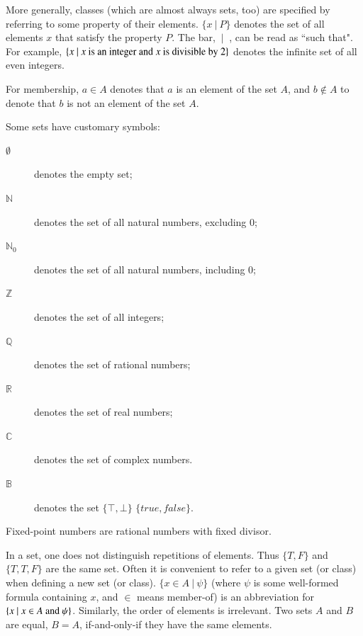 \pn More generally, classes (which are almost always sets, too) are specified by referring to some property of their elements.
\(\{x~\vert~ P\}\)
denotes the set of all elements $x$ that satisfy the property $P$.  The bar, $~\vert~$
, can be read as ``such that".
For example,
\(\{x~\vert~x~$is an integer and$~x~$is divisible by 2$\}\)
denotes the infinite set of all even integers.

\pn For membership, $a\in A$ denotes that $a$ is an element of the set $A$, and 
$b\notin A$ to denote that $b$ is not an element of the set $A$.  

\pn Some sets have customary symbols: 
\begin{description}
\item[$\emptyset$] denotes the empty 
set;
\item[$\mathbb{N}$] denotes the set of all natural numbers, excluding 0; 
\item[$\mathbb{N}_0$] denotes the set of all natural numbers, including 0; 
\item[$\mathbb{Z}$] denotes the set of all integers; 
\item[$\mathbb{Q}$] denotes the set of rational numbers; 
\item[$\mathbb{R}$] denotes the set of real numbers;
\item[$\mathbb{C}$] denotes the set of complex numbers.
\item[$\mathbb{B}$] denotes the set \(\{\top, \bot\}\) \(\{{true}, {false}\}\).
\end{description}
Fixed-point numbers are rational numbers with fixed divisor.

\pn In a set, one does not distinguish repetitions of elements.  Thus \(\{T,F\}\) and \(\{T,T,F\}\) are the same set.
Often it is convenient to refer to a given set (or class) when defining a new set (or class).
\(\{x\in A~\vert~ \psi\}\) (where $\psi$ is some well-formed formula containing $x$, and $\in$ means member-of) is an abbreviation for \(\{x~\vert~ x\in A~$and$~\psi\}\).  Similarly, the order of elements is irrelevant.  Two sets $A$ and $B$ are equal, $B=A$, if-and-only-if they have the same elements.

